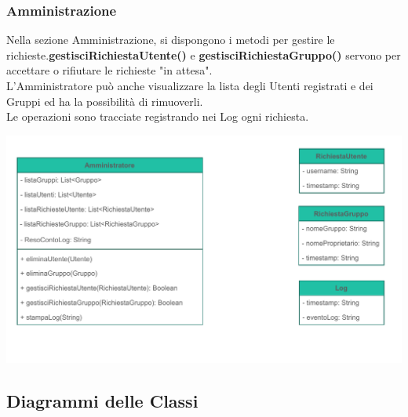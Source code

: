 \pagebreak
\subsubsection*{Amministrazione}
{}
\vspace{0.5cm}

Nella sezione Amministrazione, si dispongono i metodi per gestire le richieste.\linebreak \textbf{gestisciRichiestaUtente()} e \textbf{gestisciRichiestaGruppo()} servono per accettare o rifiutare le richieste "in attesa". \\
L'Amministratore può anche visualizzare la lista degli Utenti registrati e dei Gruppi ed ha la possibilità di rimuoverli.\\
Le operazioni sono tracciate registrando nei Log ogni richiesta.

\vspace{1cm}
\begin{adjustwidth}{-1.5cm}{0cm}
\includegraphics[scale=1]{dominio/Dominio-Amministrazione.drawio.pdf}
\end{adjustwidth}
\pagebreak

{}


\subsection*{Diagrammi delle Classi}

